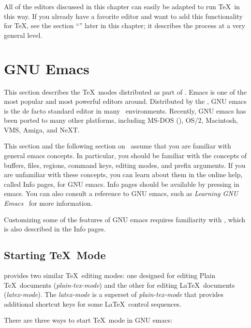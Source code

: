All of the editors discussed in this chapter can easily be adapted to
run \TeX\ in this way.  If you already have a favorite editor and
want to add this functionality for \TeX, see the section
``'' later in this chapter; it describes the process
at a very general level.

\section{GNU Emacs}

This section describes the \TeX\ modes distributed 
as part of .
Emacs is one of the most popular and most powerful editors around.
Distributed by the , GNU 
emacs is the de facto
standard editor in many \Unix\ environments.  Recently, GNU emacs has been
ported to many other platforms, including MS-DOS (),
OS/2, Macintosh, VMS, Amiga, and NeXT.

\begin{sidebar}
This section and the following section on \auctex\ assume that you are
familiar with general emacs concepts.  In particular, you should be
familiar with the concepts of buffers, files, regions, command keys,
editing modes, and prefix arguments.  If you are unfamiliar with these
concepts, you can learn about them in the online help, called Info
pages, for GNU emacs.  Info pages should be available by pressing
  in emacs.  You can also consult a reference to
GNU emacs, such as {\it Learning GNU Emacs}~\cite{or:emacs} for more
information.
\end{sidebar}

Customizing some of the features of GNU emacs requires familiarity
with , which is also described in the 
Info pages.

\subsection{Starting \TeX\ Mode}

 provides 
two similar \TeX\ editing modes: one designed for
editing Plain \TeX\ documents (\textit{plain-tex-mode}) and the other for
editing \LaTeX\ documents (\textit{latex-mode}).  The
\textit{latex-mode} is a superset of \textit{plain-tex-mode} that
provides additional shortcut keys for some \LaTeX\ control sequences.

There are three ways to start \TeX\ mode in GNU emacs:

